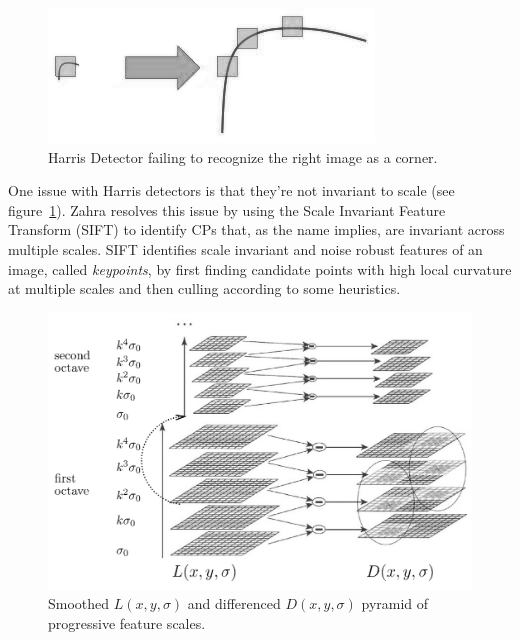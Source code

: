 \begin{figure}
    \centering
    \includegraphics[width=\linewidth,keepaspectratio]{figures/registration/sift/sift_scale_invariant.png}
    \caption{Harris Detector failing to recognize the right image as a corner.}
    \label{fig:sift_harris}
\end{figure}
One issue with Harris detectors is that they're not invariant to scale (see figure~\ref{fig:sift_harris}).
%
Zahra \etal\cite{zahrasift} resolves this issue by using the Scale Invariant Feature Transform\cite{lowe2004distinctive} (SIFT) to identify CPs that, as the name implies, are invariant across multiple scales.
%
SIFT identifies scale invariant and noise robust features of an image, called \textit{keypoints}, by first finding candidate points with high local curvature at multiple scales and then culling according to some heuristics.
\begin{figure}
    \centering
    \includegraphics[width=\linewidth,keepaspectratio]{figures/registration/sift/pyramid.png}
    \caption{Smoothed $L(x,y, \sigma)$ and differenced $D(x,y,\sigma)$ pyramid of progressive feature scales\cite{lowe2004distinctive}.}
    \label{fig:sift_pyramid}
\end{figure}
